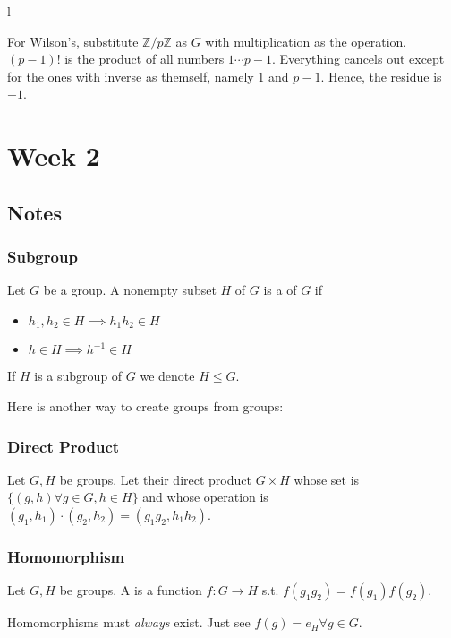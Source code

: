 l\documentclass{scrartcl}
\begin{document}
For Wilson's, substitute $\mathbb{Z}/p\mathbb{Z}$ as $G$ with multiplication as the operation. $(p-1)!$ is the product of all numbers $1 \cdots p-1$. Everything cancels out except for the ones with inverse as themself, namely $1$ and $p-1$. Hence, the residue is $-1$. \blackqed 

\section{Week 2}

\subsection{Notes}
\subsubsection{Subgroup}
\begin{definition}
	Let $G$ be a group. A nonempty subset $H$ of $G$ is a  of $G$ if
	\begin{itemize}
		\item $h_1,h_2 \in H \implies h_1h_2 \in H$
		\item $h \in H \implies h^{-1} \in H$
	\end{itemize}
	If $H$ is a subgroup of $G$ we denote $H \le G$.
\end{definition}
Here is another way to create groups from groups:
\subsubsection{Direct Product}
\begin{definition}
	Let $G, H$ be groups. Let their direct product $G \times H$ whose set is $\{(g,h) \forall g \in G, h \in H \}$ and whose operation is $(g_1,h_1) \cdot (g_2,h_2) = (g_1g_2, h_1h_2)$.
\end{definition}

\subsubsection{Homomorphism}
\begin{definition}
	Let $G, H$ be groups. A  is a function $f : G \rightarrow H$ s.t. $f(g_1g_2) = f(g_1)f(g_2)$.
\end{definition}

Homomorphisms must \textit{always} exist. Just see $f(g) = e_H \forall g \in G$.
\end{document}
